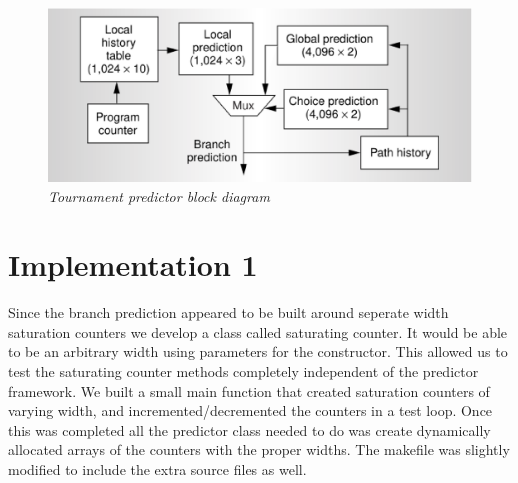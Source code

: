 \documentclass[]{report}   %
\begin{document}
\begin{center}
  \begin{figure}[h]
    \label{block-diagram}
    \includegraphics[width=5in]{block_diagram.eps}
    \caption*{\textit{Tournament predictor block diagram\cite{kessler}}}
  \end{figure}
\end{center}
\pagebreak

\section{Implementation 1}
\par{Since the branch prediction appeared to be built around seperate width saturation counters we develop a class called saturating counter.
It would be able to be an arbitrary width using parameters for the constructor.
This allowed us to test the saturating counter methods completely independent of the predictor framework.
We built a small main function that created saturation counters of varying width, and incremented/decremented the counters in a test loop.
Once this was completed all the predictor class needed to do was create dynamically allocated arrays of the counters with the proper widths.
The makefile was slightly modified to include the extra source files as well.}
\end{document}
